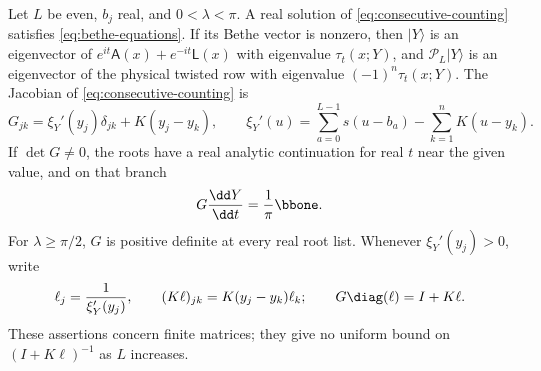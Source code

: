 \begin{lemma}\label{lem:bethe-data}
Let $L$ be even, $b_j$ real, and $0<\lambda<\pi$.
A real solution of \eqref{eq:consecutive-counting} satisfies
\eqref{eq:bethe-equations}.  If its Bethe vector is nonzero, then
$|Y\rangle$ is an eigenvector of
$e^{it}\mathsf A(x)+e^{-it}\mathsf L(x)$ with eigenvalue
$\tau_t(x;Y)$, and $\mathcal P_L|Y\rangle$ is an eigenvector of the
physical twisted row with eigenvalue $(-1)^n\tau_t(x;Y)$.
The Jacobian of \eqref{eq:consecutive-counting} is
\begin{equation}\label{eq:Gaudin-matrix}
 G_{jk}=\xi_Y'(y_j)\delta_{jk}+K(y_j-y_k),\qquad
 \xi_Y'(u)=\sum_{a=0}^{L-1}s(u-b_a)-\sum_{k=1}^nK(u-y_k).
\end{equation}
If $\det G\ne0$, the roots have a real analytic continuation for real
$t$ near the given value, and on that branch
\begin{equation}\label{eq:twist-root-derivative}
 G\frac{\dd Y}{\dd t}=\frac1\pi\bbone.
\end{equation}
For $\lambda\ge\pi/2$, $G$ is positive definite at every real root
list.  Whenever $\xi_Y'(y_j)>0$, write
\begin{equation}\label{eq:Gaudin-weights}
 \ell_j=\frac1{\xi_Y'(y_j)},\qquad
 (K\ell)_{jk}=K(y_j-y_k)\ell_k;
 \qquad G\diag(\ell)=I+K\ell.
\end{equation}
These assertions concern finite matrices; they give no uniform bound on
$(I+K\ell)^{-1}$ as $L$ increases.
\end{lemma}

